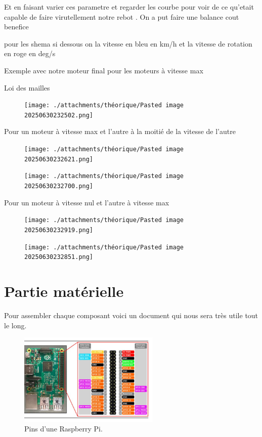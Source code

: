 \documentclass[a4paper,12pt]{report}  %
\begin{document}
Et en faisant varier ces parametre et regarder les courbe pour voir de ce qu'etait capable de faire virutellement notre rebot . On a put faire une balance cout benefice 

pour les shema si dessous on la vitesse en bleu en km/h et la vitesse de rotation en roge en deg/s

Exemple avec notre moteur final pour les moteurs à vitesse max

Loi des mailles 
\begin{figure}[H]
	\centering
	\texttt{[image: ./attachments/théorique/Pasted image 20250630232502.png]}
	\caption{}
\end{figure}

Pour un moteur à vitesse max et l'autre à la moitié de la vitesse de l'autre 
\begin{figure}[H]
	\centering
	\texttt{[image: ./attachments/théorique/Pasted image 20250630232621.png]}
	\caption{}
\end{figure}
\begin{figure}[H]
	\centering
	\texttt{[image: ./attachments/théorique/Pasted image 20250630232700.png]}
	\caption{}
\end{figure}

Pour un moteur à vitesse nul et l'autre à vitesse max
\begin{figure}[H]
	\centering
	\texttt{[image: ./attachments/théorique/Pasted image 20250630232919.png]}
	\caption{}
\end{figure}

\begin{figure}[H]
	\centering
	\texttt{[image: ./attachments/théorique/Pasted image 20250630232851.png]}
	\caption{}
\end{figure}



\pagebreak
\section{Partie matérielle}
Pour assembler chaque composant voici un document qui nous sera très utile tout le long. 

\begin{figure}[H]
	\centering
	\includegraphics[width=0.6\textwidth]{./attachments/raspberry_pi_pin_map.jpg}
	\caption{Pins d'une Raspberry Pi. }
\end{figure}
\end{document}
